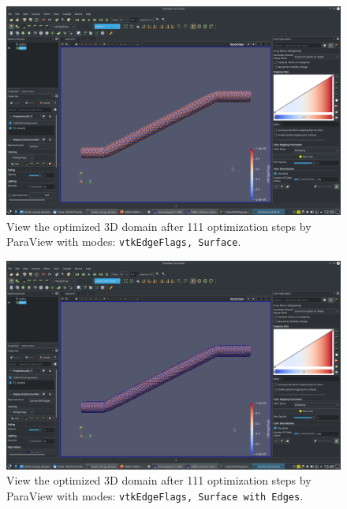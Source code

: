 \documentclass[onsided]{book}
\numberwithin{equation}{section}
\begin{document}
\begin{enumerate}
\begin{enumerate}
        \begin{figure}[H]
            \centering
            \includegraphics[height=0.44\textheight]{optimized_domain_3D_after_111_steps_vtkEdgeFlags_Surface}
            \caption{View the optimized 3D domain after 111 optimization steps by ParaView with modes: \texttt{vtkEdgeFlags, Surface}.}
        \end{figure}
        
        \begin{figure}[H]
            \centering
            \includegraphics[height=0.44\textheight]{optimized_domain_3D_after_111_steps_vtkEdgeFlags_Surface_with_Edges}
            \caption{View the optimized 3D domain after 111 optimization steps by ParaView with modes: \texttt{vtkEdgeFlags, Surface with Edges}.}
        \end{figure}
        

\end{enumerate}
\end{enumerate}
\end{document}
